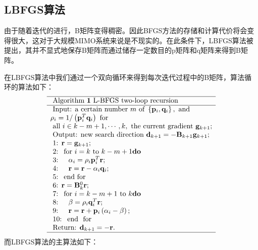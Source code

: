\documentclass[twocolumn]{ctexart}
\begin{document}
\subsection{LBFGS算法}
\par 由于随着迭代的进行，B矩阵变得稠密。因此BFGS方法的存储和计算代价将会变得很大，这对于大规模MIMO系统来说是不现实的。在此条件下，LBFGS算法被提出，其并不显式地保存B矩阵而通过储存一定数目的p矩阵和q矩阵来得到B矩阵。
\par 在LBFGS算法中我们通过一个双向循环来得到每次迭代过程中的B矩阵，算法循环的算法如下：
\[\begin{array}{l}
\hline \text { Algorithm } \mathbf{1} \text { L-BFGS two-loop recursion } \\
\hline \text { Input: a certain number } m \text { of }\left\{\mathbf{p}_{i}, \mathbf{q}_{i}\right\}, \text { and }\\ \rho_{i}=1 /\left(\mathbf{p}_{i}^{T} \mathbf{q}_{i}\right) \text { for } \\
\text { all } i \in k-m+1, \cdots, k, \text { the current gradient } \mathbf{g}_{k+1} ; \\
\text { Output: new search direction } \mathbf{d}_{k+1}=-\mathbf{B}_{k+1} \mathbf{g}_{k+1} ; \\
\text { 1: } \mathbf{r}=\mathbf{g}_{k+1} ; \\
\text { 2: } \text { for } i=k \text { to } k-m+1 \mathbf{d o} \\
\text { 3: } \quad \alpha_{i}=\rho_{i} \mathbf{p}_{i}^{T} \mathbf{r} ; \\
\text { 4: } \quad \mathbf{r}=\mathbf{r}-\alpha_{i} \mathbf{q}_{i} ; \\
\text { 5: } \text { end for } \\
\text { 6: } \mathbf{r}=\mathbf{B}_{k}^{0} \mathbf{r} ; \\
\text { 7: } \text { for } i=k-m+1 \text { to } k \mathbf{d o} \\
\text { 8: } \quad \beta=\rho_{i} \mathbf{q}_{i}^{T} \mathbf{r} ; \\
\text { 9: } \quad \mathbf{r}=\mathbf{r}+\mathbf{p}_{i}\left(\alpha_{i}-\beta\right) ; \\
\text { 10: } \text { end } \text { for } \\
\text { Return: } \mathbf{d}_{k+1}=-\mathbf{r} . \\
\hline
\end{array}\]
而LBFGS算法的主算法如下：
\end{document}
